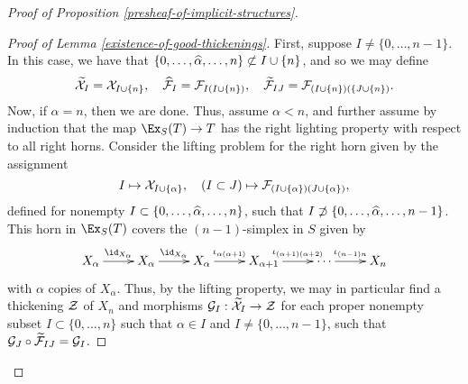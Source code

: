 \begin{proof}[Proof of Proposition \ref{presheaf-of-implicit-structures}]
\begin{proof}[Proof of Lemma \ref{existence-of-good-thickenings}]

First, suppose $I \neq \{0, \dots, n-1\}$. In this case, we have that $\{0, \dots, \widehat \alpha, \dots, n\} \not\subset I \cup \{n\}$, and so we may define
\[ \widetilde {\mathcal X}_I = \mathcal X_{I \cup \{n\}}, \quad \widehat {\mathcal F}_I = \mathcal F_{I (I \cup \{n\})}, \quad \widetilde {\mathcal F}_{IJ} = \mathcal F_{(I \cup \{n\})(\{J \cup \{n\})}. \]
Now, if $\alpha = n$, then we are done. Thus, assume $\alpha < n$, and further assume by induction that the map $\Ex_S(T) \to T$ has the right lighting property with respect to all right horns. Consider the lifting problem for the right horn given by the assignment
\[ I \mapsto \mathcal X_{I \cup \{\alpha\}}, \quad \left(I \subset J \right) \mapsto \mathcal F_{(I \cup \{ \alpha \})(J \cup \{ \alpha \})}, \]
defined for nonempty $I \subset \{0, \dots, \widehat \alpha, \dots, n\}$, such that $I \not\supset \{0, \dots, \widehat \alpha, \dots, n-1\}$. This horn in $\Ex_S(T)$ covers the $(n-1)$-simplex in $S$ given by
\[\xymatrix{
X_\alpha \ar[r]^-{\id_{X_\alpha}} & X_\alpha \ar[r]^-{\id_{X_\alpha}} & X_\alpha \ar[r]^-{\iota_{\alpha(\alpha+1)}} & X_{\alpha + 1} \ar[r]^-{\iota_{(\alpha+1)(\alpha+2)}} & \cdots \ar[r]^-{\iota_{(n-1)n}} & X_n
}\]
with $\alpha$ copies of $X_\alpha$. Thus, by the lifting property, we may in particular find a thickening $\mathcal Z$ of $X_n$ and morphisms $\mathcal G_I: \widetilde {\mathcal X}_I \to \mathcal Z$ for each proper nonempty subset $I \subset \{0, \dots, n\}$ such that $\alpha \in I$ and $I \neq \{0, \dots, n-1\}$, such that $\mathcal G_J \circ \widetilde {\mathcal F}_{IJ} = \mathcal G_I$.


\end{proof}


\end{proof}
